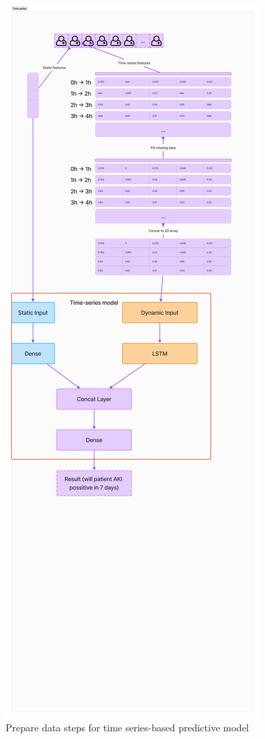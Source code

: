 \documentclass[../main.tex]{subfiles}
\begin{document}
\begin{figure}[h]
    \centering
    \includegraphics[width=\textwidth]{Figure/time-series-steps.png}
    \caption{Prepare data steps for time series-based predictive model}
    \label{fig:time-series-steps}
\end{figure}
\end{document}
